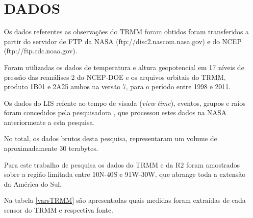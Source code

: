 


\section{DADOS}

Os dados referentes as observações do TRMM foram obtidos foram transferidos a partir do servidor de FTP da NASA (ftp://disc2.nascom.nasa.gov) e do NCEP (ftp://ftp.cdc.noaa.gov).

Foram utilizadas os dados de temperatura e altura geopotencial em 17 níveis de pressão das reanálises 2 do NCEP-DOE e os arquivos orbitais do TRMM, produto 1B01 e 2A25 ambos na versão 7, para o período entre 1998 e 2011. 



Os dados do LIS refente ao tempo de visada (\textit{view time}), eventos, grupos e raios foram concedidos pela pesquisadora , que processou estes dados na NASA anteriormente a esta pesquisa. 

No total, os dados brutos desta pesquisa, representaram um volume de  aproximadamente 30 terabytes. 

Para este trabalho de pesquisa os dados do TRMM e da R2 foram amostrados sobre a região limitada entre 10N-40S e 91W-30W, que abrange toda a extensão da América do Sul. 

Na tabela \ref{varsTRMM} são apresentadas quais medidas foram  extraídas de cada sensor do TRMM e respectiva fonte.


